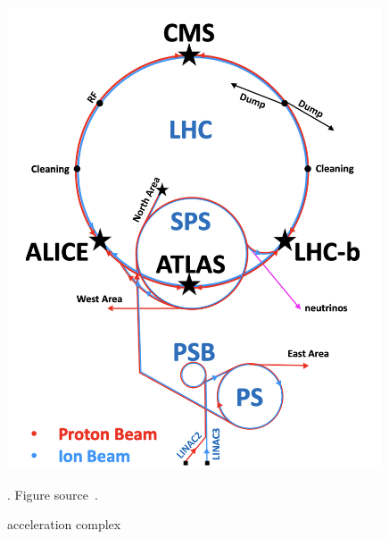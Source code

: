 \begin{figure}[t!]
\centering
\includegraphics[width=0.99\textwidth]{figures/acceleration_chain.png}
\caption[acceleration complex]{acceleration complex}. Figure source~\cite{SMtable}.
\label{fig:acceleration_complex}
\end{figure} 
   


